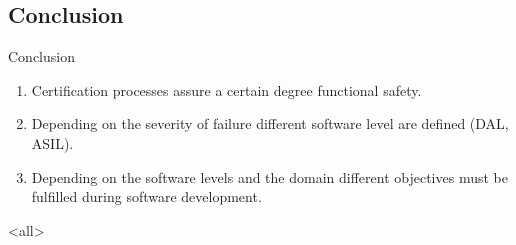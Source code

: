 \subsection*{Conclusion}

\begin{frame}{Conclusion}
	\begin{enumerate}
		\item Certification processes assure a certain degree \alert{functional safety}.
		\item Depending on the severity of failure different \alert{software level} are defined (DAL, ASIL).
		\item Depending on the software levels and the domain different \alert{objectives} must be fulfilled during software development.
	\end{enumerate}
\end{frame}




\mode
<all>